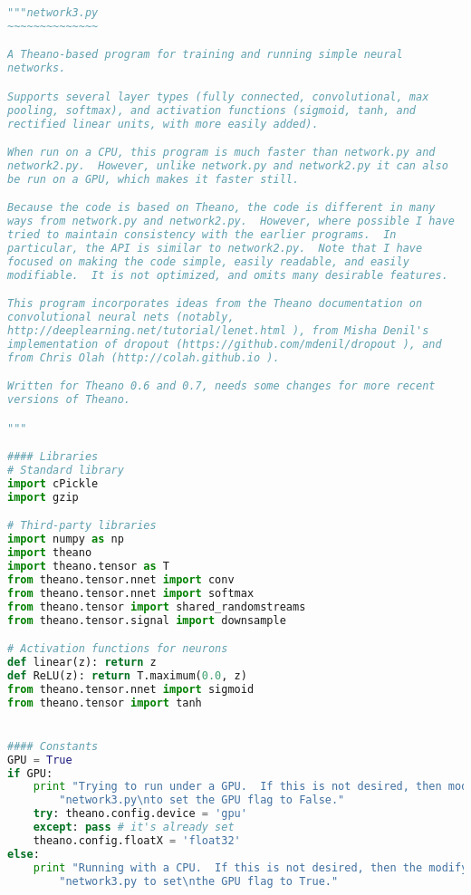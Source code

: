 \begin{fullwidth}
\begin{lstlisting}[caption={network3.py (Python 2.7)},label={lst:network3.py}, language=Python]
"""network3.py
~~~~~~~~~~~~~~

A Theano-based program for training and running simple neural
networks.

Supports several layer types (fully connected, convolutional, max
pooling, softmax), and activation functions (sigmoid, tanh, and
rectified linear units, with more easily added).

When run on a CPU, this program is much faster than network.py and
network2.py.  However, unlike network.py and network2.py it can also
be run on a GPU, which makes it faster still.

Because the code is based on Theano, the code is different in many
ways from network.py and network2.py.  However, where possible I have
tried to maintain consistency with the earlier programs.  In
particular, the API is similar to network2.py.  Note that I have
focused on making the code simple, easily readable, and easily
modifiable.  It is not optimized, and omits many desirable features.

This program incorporates ideas from the Theano documentation on
convolutional neural nets (notably,
http://deeplearning.net/tutorial/lenet.html ), from Misha Denil's
implementation of dropout (https://github.com/mdenil/dropout ), and
from Chris Olah (http://colah.github.io ).

Written for Theano 0.6 and 0.7, needs some changes for more recent
versions of Theano.

"""

#### Libraries
# Standard library
import cPickle
import gzip

# Third-party libraries
import numpy as np
import theano
import theano.tensor as T
from theano.tensor.nnet import conv
from theano.tensor.nnet import softmax
from theano.tensor import shared_randomstreams
from theano.tensor.signal import downsample

# Activation functions for neurons
def linear(z): return z
def ReLU(z): return T.maximum(0.0, z)
from theano.tensor.nnet import sigmoid
from theano.tensor import tanh


#### Constants
GPU = True
if GPU:
    print "Trying to run under a GPU.  If this is not desired, then modify "+\
        "network3.py\nto set the GPU flag to False."
    try: theano.config.device = 'gpu'
    except: pass # it's already set
    theano.config.floatX = 'float32'
else:
    print "Running with a CPU.  If this is not desired, then the modify "+\
        "network3.py to set\nthe GPU flag to True."


\end{lstlisting}
\end{fullwidth}
